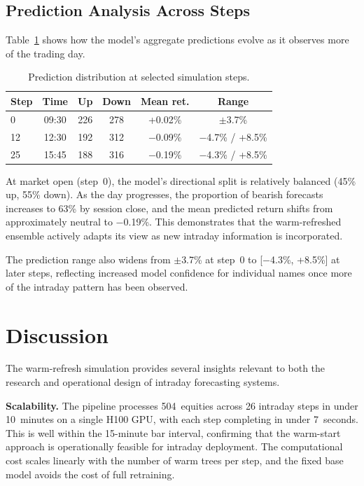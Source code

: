 \documentclass[conference]{IEEEtran}
\begin{document}
\subsection{Prediction Analysis Across Steps}

Table~\ref{tab:steppredictions} shows how the model's aggregate predictions evolve as it observes more of the trading day.

\begin{table}[h]
\centering
\caption{Prediction distribution at selected simulation steps.}
\label{tab:steppredictions}
\begin{tabular}{lccccc}
\hline
\textbf{Step} & \textbf{Time} & \textbf{Up} & \textbf{Down} & \textbf{Mean ret.} & \textbf{Range} \\
\hline
0  & 09:30 & 226 & 278 & +0.02\% & $\pm$3.7\% \\
12 & 12:30 & 192 & 312 & $-$0.09\% & $-$4.7\% / +8.5\% \\
25 & 15:45 & 188 & 316 & $-$0.19\% & $-$4.3\% / +8.5\% \\
\hline
\end{tabular}
\end{table}

At market open (step~0), the model's directional split is relatively balanced (45\% up, 55\% down). As the day progresses, the proportion of bearish forecasts increases to 63\% by session close, and the mean predicted return shifts from approximately neutral to $-$0.19\%. This demonstrates that the warm-refreshed ensemble actively adapts its view as new intraday information is incorporated.

The prediction range also widens from $\pm$3.7\% at step~0 to [$-$4.3\%, +8.5\%] at later steps, reflecting increased model confidence for individual names once more of the intraday pattern has been observed.

\section{Discussion}\label{sec:discussion}

The warm-refresh simulation provides several insights relevant to both the research and operational design of intraday forecasting systems.

\textbf{Scalability.}
The pipeline processes 504~equities across 26 intraday steps in under 10~minutes on a single H100 GPU, with each step completing in under 7~seconds. This is well within the 15-minute bar interval, confirming that the warm-start approach is operationally feasible for intraday deployment. The computational cost scales linearly with the number of warm trees per step, and the fixed base model avoids the cost of full retraining.
\end{document}
